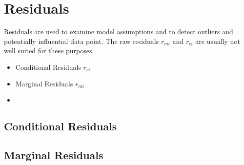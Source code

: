 \documentclass[Chap5amain.tex]{subfiles}
\begin{document}
\section*{Residuals}

Residuals are used to examine model assumptions and to detect outliers and potentially influential data
point. The raw residuals $r_{mi}$ and $r_{ci}$ are usually not well suited for these purposes.

\begin{itemize}
\item Conditional Residuals $r_{ci}$
\item Marginal Residuals $r_{mi}$
\item 
\end{itemize}
\subsection*{Conditional Residuals}

\subsection*{Marginal Residuals}
\end{document}

